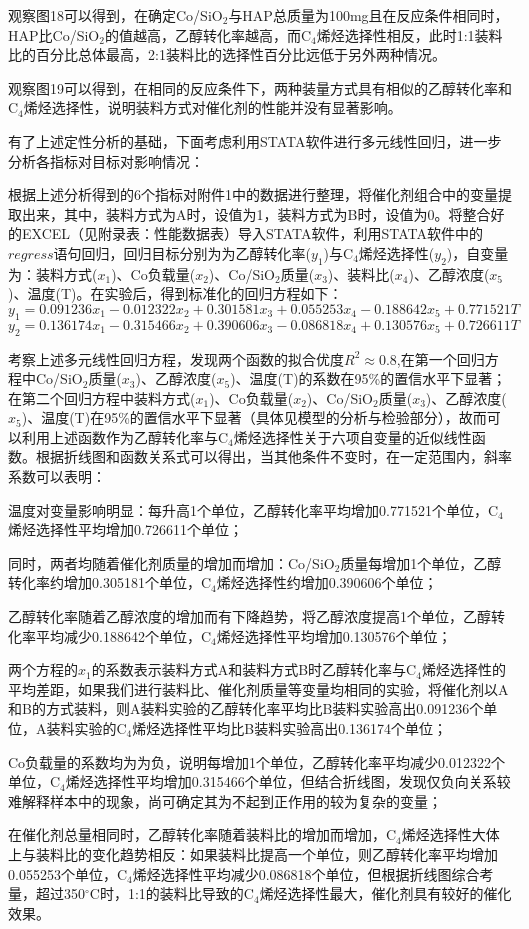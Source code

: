 \documentclass[a4paper,10.5pt]{ctexart}
\begin{document}
\par 观察图18可以得到，在确定Co/SiO$_2$与HAP总质量为100mg且在反应条件相同时，HAP比Co/SiO$_2$的值越高，乙醇转化率越高，而C$_4$烯烃选择性相反，此时1:1装料比的百分比总体最高，2:1装料比的选择性百分比远低于另外两种情况。
\par 观察图19可以得到，在相同的反应条件下，两种装量方式具有相似的乙醇转化率和C$_4$烯烃选择性，说明装料方式对催化剂的性能并没有显著影响。
~\\
\par 有了上述定性分析的基础，下面考虑利用STATA软件进行多元线性回归，进一步分析各指标对目标对影响情况：
\par 根据上述分析得到的6个指标对附件1中的数据进行整理，将催化剂组合中的变量提取出来，其中，装料方式为A时，设值为1，装料方式为B时，设值为0。将整合好的EXCEL（见附录表：性能数据表）导入STATA软件，利用STATA软件中的$regress$语句回归，回归目标分别为为乙醇转化率($y_1$)与C$_4$烯烃选择性($y_2$)，自变量为：装料方式($x_1$)、Co负载量($x_2$)、Co/SiO$_2$质量($x_3$)、装料比($x_4$)、乙醇浓度($x_5$)、温度(T)。在实验后，得到标准化的回归方程如下：
$$y_1=0.091236x_1-0.012322x_2+0.301581x_3+0.055253x_4-0.188642x_5+0.771521T$$
$$y_2=0.136174x_1-0.315466x_2+0.390606x_3-0.086818x_4+0.130576x_5+0.726611T$$
\par 考察上述多元线性回归方程，发现两个函数的拟合优度$R^2\approx 0.8$,在第一个回归方程中Co/SiO$_2$质量($x_3$)、乙醇浓度($x_5$)、温度(T)的系数在95\%的置信水平下显著；在第二个回归方程中装料方式($x_1$)、Co负载量($x_2$)、Co/SiO$_2$质量($x_3$)、乙醇浓度($x_5$)、温度(T)在95\%的置信水平下显著（具体见模型的分析与检验部分），故而可以利用上述函数作为乙醇转化率与C$_4$烯烃选择性关于六项自变量的近似线性函数。根据折线图和函数关系式可以得出，当其他条件不变时，在一定范围内，斜率系数可以表明：
\par 温度对变量影响明显：每升高1个单位，乙醇转化率平均增加0.771521个单位，C$_4$烯烃选择性平均增加0.726611个单位；
\par 同时，两者均随着催化剂质量的增加而增加：Co/SiO$_2$质量每增加1个单位，乙醇转化率约增加0.305181个单位，C$_4$烯烃选择性约增加0.390606个单位；
\par 乙醇转化率随着乙醇浓度的增加而有下降趋势，将乙醇浓度提高1个单位，乙醇转化率平均减少0.188642个单位，C$_4$烯烃选择性平均增加0.130576个单位；
\par 两个方程的$x_1$的系数表示装料方式A和装料方式B时乙醇转化率与C$_4$烯烃选择性的平均差距，如果我们进行装料比、催化剂质量等变量均相同的实验，将催化剂以A和B的方式装料，则A装料实验的乙醇转化率平均比B装料实验高出0.091236个单位，A装料实验的C$_4$烯烃选择性平均比B装料实验高出0.136174个单位；
\par Co负载量的系数均为为负，说明每增加1个单位，乙醇转化率平均减少0.012322个单位，C$_4$烯烃选择性平均增加0.315466个单位，但结合折线图，发现仅负向关系较难解释样本中的现象，尚可确定其为不起到正作用的较为复杂的变量；
\par 在催化剂总量相同时，乙醇转化率随着装料比的增加而增加，C$_4$烯烃选择性大体上与装料比的变化趋势相反：如果装料比提高一个单位，则乙醇转化率平均增加0.055253个单位，C$_4$烯烃选择性平均减少0.086818个单位，但根据折线图综合考量，超过350$^{\circ}$C时，1:1的装料比导致的C$_4$烯烃选择性最大，催化剂具有较好的催化效果。
\end{document}
